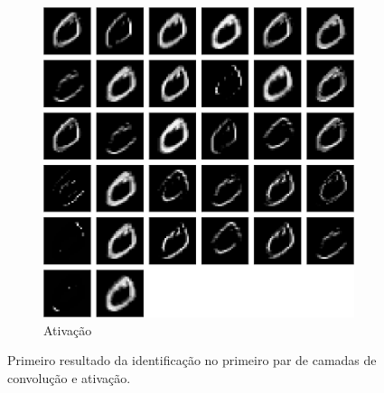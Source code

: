 \documentclass[
	12pt,				%
	oneside,			%
	a4paper,			%
	english,			%
	french,				%
	spanish,			%
	brazil,				%
	]{abntex2}
\begin{document}
\begin{center}
\begin{figure}[h]
\begin{subfigure}{.8\textwidth}
\centering
\includegraphics[width=.6\linewidth]{images/fabio/resultados/network_3/input_1_layer_activation_1}%
\caption{Ativação}			
\end{subfigure}%
\label{fig:camada_1}
\caption{Primeiro resultado da identificação no primeiro par de camadas de convolução e ativação.}
\end{figure}
\end{center}
\end{document}
